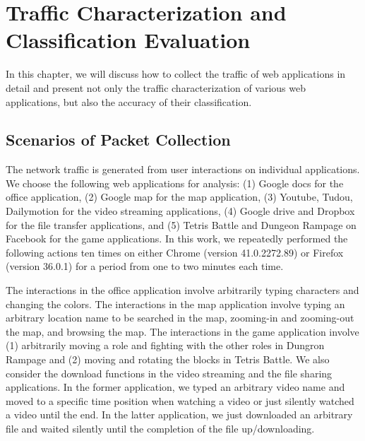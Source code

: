 \chapter{Traffic Characterization and Classification Evaluation}
\label{classification}
In this chapter, we will discuss how to collect the traffic of web applications in detail and present not only the traffic characterization of various web applications, but also the accuracy of their classification.

\section{Scenarios of Packet Collection}
\label{sec:scenario}
The network traffic is generated from user interactions on individual applications. We choose the following web applications for analysis: (1) Google docs for the office application, (2) Google map for the map application, (3) Youtube, Tudou, Dailymotion for the video streaming applications, (4) Google drive and Dropbox for the file transfer applications, and (5) Tetris Battle and Dungeon Rampage on Facebook for the game applications. In this work, we repeatedly performed the following actions ten times on either Chrome (version 41.0.2272.89) or Firefox (version 36.0.1) for a period from one to two minutes each time.

The interactions in the office application involve arbitrarily typing characters and changing the colors. The interactions in the map application involve typing an arbitrary location name to be searched in the map, zooming-in and zooming-out the map, and browsing the map. The interactions in the game application involve (1) arbitrarily moving a role and fighting with the other roles in Dungron Rampage and (2) moving and rotating the blocks in Tetris Battle. We also consider the download functions in the video streaming and the file sharing applications. In the former application, we typed an arbitrary video name and moved to a specific time position when watching a video or just silently watched a video until the end. In the latter application, we just downloaded an arbitrary file and waited silently until the completion of the file up/downloading.


